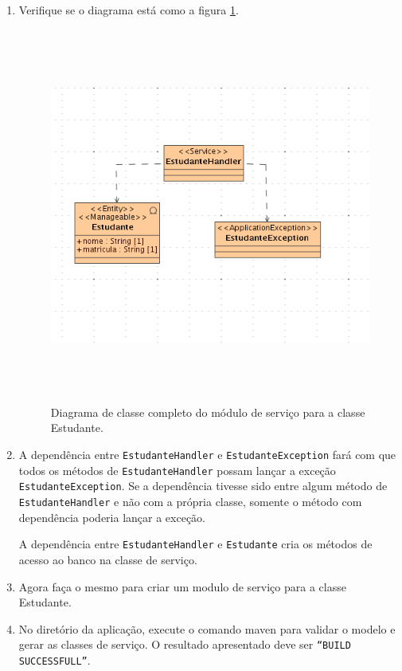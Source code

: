 \begin{enumerate}
\item Verifique se o diagrama está como a figura
\ref{resultado_diagrama_classe_servico}.
\begin{figure}[H]
	\centering
	\includegraphics[width=360pt,height=350pt]{imgs/tutorial-mdarte-0011.png}
	\caption{Diagrama de classe completo do módulo de serviço para a classe
	Estudante.}
	\label{resultado_diagrama_classe_servico}
\end{figure}

\item A dependência entre \texttt{EstudanteHandler} e
\texttt{EstudanteException} fará com que todos os métodos de
\texttt{EstudanteHandler} possam lançar a exceção \texttt{EstudanteException}.
Se a dependência tivesse sido entre algum método de \texttt{EstudanteHandler} e
não com a própria classe, somente o método com dependência poderia lançar a
exceção.

A dependência entre \texttt{EstudanteHandler} e \texttt{Estudante} cria os
métodos de acesso ao banco na classe de serviço.

\item Agora faça o mesmo para criar um modulo de serviço para a classe Estudante.
	
\item No diretório da aplicação, execute o comando maven para validar o modelo e
gerar as classes de serviço. O resultado apresentado deve ser \texttt{“BUILD
SUCCESSFULL”}.
\end{enumerate}

